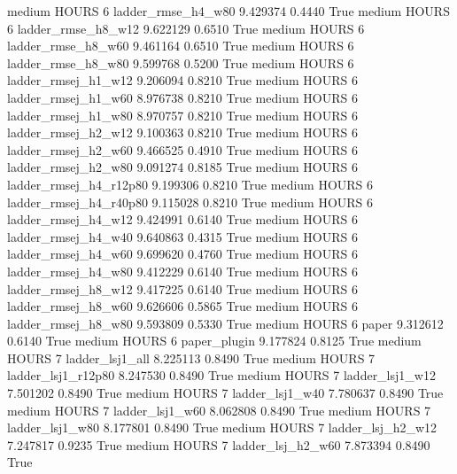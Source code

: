     medium    HOURS                 6     ladder_rmse_h4_w80   9.429374      0.4440    True
    medium    HOURS                 6     ladder_rmse_h8_w12   9.622129      0.6510    True
    medium    HOURS                 6     ladder_rmse_h8_w60   9.461164      0.6510    True
    medium    HOURS                 6     ladder_rmse_h8_w80   9.599768      0.5200    True
    medium    HOURS                 6    ladder_rmsej_h1_w12   9.206094      0.8210    True
    medium    HOURS                 6    ladder_rmsej_h1_w60   8.976738      0.8210    True
    medium    HOURS                 6    ladder_rmsej_h1_w80   8.970757      0.8210    True
    medium    HOURS                 6    ladder_rmsej_h2_w12   9.100363      0.8210    True
    medium    HOURS                 6    ladder_rmsej_h2_w60   9.466525      0.4910    True
    medium    HOURS                 6    ladder_rmsej_h2_w80   9.091274      0.8185    True
    medium    HOURS                 6 ladder_rmsej_h4_r12p80   9.199306      0.8210    True
    medium    HOURS                 6 ladder_rmsej_h4_r40p80   9.115028      0.8210    True
    medium    HOURS                 6    ladder_rmsej_h4_w12   9.424991      0.6140    True
    medium    HOURS                 6    ladder_rmsej_h4_w40   9.640863      0.4315    True
    medium    HOURS                 6    ladder_rmsej_h4_w60   9.699620      0.4760    True
    medium    HOURS                 6    ladder_rmsej_h4_w80   9.412229      0.6140    True
    medium    HOURS                 6    ladder_rmsej_h8_w12   9.417225      0.6140    True
    medium    HOURS                 6    ladder_rmsej_h8_w60   9.626606      0.5865    True
    medium    HOURS                 6    ladder_rmsej_h8_w80   9.593809      0.5330    True
    medium    HOURS                 6                  paper   9.312612      0.6140    True
    medium    HOURS                 6           paper_plugin   9.177824      0.8125    True
    medium    HOURS                 7        ladder_lsj1_all   8.225113      0.8490    True
    medium    HOURS                 7     ladder_lsj1_r12p80   8.247530      0.8490    True
    medium    HOURS                 7        ladder_lsj1_w12   7.501202      0.8490    True
    medium    HOURS                 7        ladder_lsj1_w40   7.780637      0.8490    True
    medium    HOURS                 7        ladder_lsj1_w60   8.062808      0.8490    True
    medium    HOURS                 7        ladder_lsj1_w80   8.177801      0.8490    True
    medium    HOURS                 7      ladder_lsj_h2_w12   7.247817      0.9235    True
    medium    HOURS                 7      ladder_lsj_h2_w60   7.873394      0.8490    True
